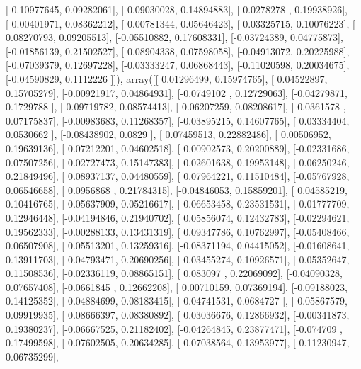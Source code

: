 \documentclass{article}
\begin{document}
       [ 0.10977645,  0.09282061],
       [ 0.09030028,  0.14894883],
       [ 0.0278278 ,  0.19938926],
       [-0.00401971,  0.08362212],
       [-0.00781344,  0.05646423],
       [-0.03325715,  0.10076223],
       [ 0.08270793,  0.09205513],
       [-0.05510882,  0.17608331],
       [-0.03724389,  0.04775873],
       [-0.01856139,  0.21502527],
       [ 0.08904338,  0.07598058],
       [-0.04913072,  0.20225988],
       [-0.07039379,  0.12697228],
       [-0.03333247,  0.06868443],
       [-0.11020598,  0.20034675],
       [-0.04590829,  0.1112226 ]]), array([[ 0.01296499,  0.15974765],
       [ 0.04522897,  0.15705279],
       [-0.00921917,  0.04864931],
       [-0.0749102 ,  0.12729063],
       [-0.04279871,  0.1729788 ],
       [ 0.09719782,  0.08574413],
       [-0.06207259,  0.08208617],
       [-0.0361578 ,  0.07175837],
       [-0.00983683,  0.11268357],
       [-0.03895215,  0.14607765],
       [ 0.03334404,  0.0530662 ],
       [-0.08438902,  0.0829    ],
       [ 0.07459513,  0.22882486],
       [ 0.00506952,  0.19639136],
       [ 0.07212201,  0.04602518],
       [ 0.00902573,  0.20200889],
       [-0.02331686,  0.07507256],
       [ 0.02727473,  0.15147383],
       [ 0.02601638,  0.19953148],
       [-0.06250246,  0.21849496],
       [ 0.08937137,  0.04480559],
       [ 0.07964221,  0.11510484],
       [-0.05767928,  0.06546658],
       [ 0.0956868 ,  0.21784315],
       [-0.04846053,  0.15859201],
       [ 0.04585219,  0.10416765],
       [-0.05637909,  0.05216617],
       [-0.06653458,  0.23531531],
       [-0.01777709,  0.12946448],
       [-0.04194846,  0.21940702],
       [ 0.05856074,  0.12432783],
       [-0.02294621,  0.19562333],
       [-0.00288133,  0.13431319],
       [ 0.09347786,  0.10762997],
       [-0.05408466,  0.06507908],
       [ 0.05513201,  0.13259316],
       [-0.08371194,  0.04415052],
       [-0.01608641,  0.13911703],
       [-0.04793471,  0.20690256],
       [-0.03455274,  0.10926571],
       [ 0.05352647,  0.11508536],
       [-0.02336119,  0.08865151],
       [ 0.083097  ,  0.22069092],
       [-0.04090328,  0.07657408],
       [-0.0661845 ,  0.12662208],
       [ 0.00710159,  0.07369194],
       [-0.09188023,  0.14125352],
       [-0.04884699,  0.08183415],
       [-0.04741531,  0.0684727 ],
       [ 0.05867579,  0.09919935],
       [ 0.08666397,  0.08380892],
       [ 0.03036676,  0.12866932],
       [-0.00341873,  0.19380237],
       [-0.06667525,  0.21182402],
       [-0.04264845,  0.23877471],
       [-0.074709  ,  0.17499598],
       [ 0.07602505,  0.20634285],
       [ 0.07038564,  0.13953977],
       [ 0.11230947,  0.06735299],
\end{document}
